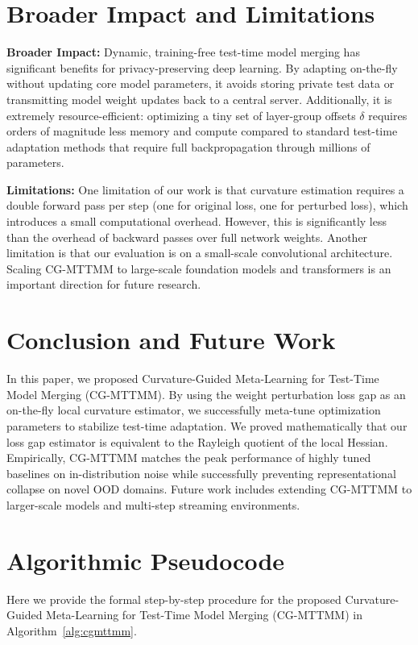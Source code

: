 \documentclass{article}
\theoremstyle{plain}
\theoremstyle{definition}
\theoremstyle{remark}
\begin{document}
\section{Broader Impact and Limitations}
\label{sec:impact}
\textbf{Broader Impact:} Dynamic, training-free test-time model merging has significant benefits for privacy-preserving deep learning. By adapting on-the-fly without updating core model parameters, it avoids storing private test data or transmitting model weight updates back to a central server. Additionally, it is extremely resource-efficient: optimizing a tiny set of layer-group offsets $\delta$ requires orders of magnitude less memory and compute compared to standard test-time adaptation methods that require full backpropagation through millions of parameters.

\textbf{Limitations:} One limitation of our work is that curvature estimation requires a double forward pass per step (one for original loss, one for perturbed loss), which introduces a small computational overhead. However, this is significantly less than the overhead of backward passes over full network weights. Another limitation is that our evaluation is on a small-scale convolutional architecture. Scaling CG-MTTMM to large-scale foundation models and transformers is an important direction for future research.

\section{Conclusion and Future Work}
\label{sec:conclusion}
In this paper, we proposed Curvature-Guided Meta-Learning for Test-Time Model Merging (CG-MTTMM). By using the weight perturbation loss gap as an on-the-fly local curvature estimator, we successfully meta-tune optimization parameters to stabilize test-time adaptation. We proved mathematically that our loss gap estimator is equivalent to the Rayleigh quotient of the local Hessian. Empirically, CG-MTTMM matches the peak performance of highly tuned baselines on in-distribution noise while successfully preventing representational collapse on novel OOD domains. Future work includes extending CG-MTTMM to larger-scale models and multi-step streaming environments.

\nocite{*}



\newpage
\appendix
\onecolumn
{}

\section{Algorithmic Pseudocode}
Here we provide the formal step-by-step procedure for the proposed Curvature-Guided Meta-Learning for Test-Time Model Merging (CG-MTTMM) in Algorithm~\ref{alg:cgmttmm}.
\end{document}

